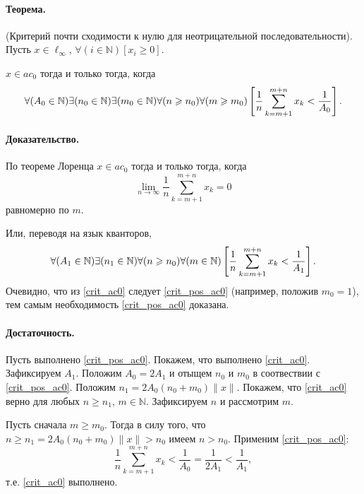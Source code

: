 \documentclass[a4paper,12pt,openbib]{report}
\begin{document}

\paragraph{Теорема.}
(Критерий почти сходимости к нулю для неотрицательной последовательности).
Пусть $x\in\ell_{\infty}$,
$\forall(i\in\mathbb{N})[x_i\geq 0]$.

$x\in ac_0$ тогда и только тогда, когда
\begin{equation}\label{crit_pos_ac0}
	\forall(A_0\in\mathbb{N})
	\exists(n_0\in\mathbb{N})
	\exists(m_0\in\mathbb{N})
	\forall(n\geq n_0)
	\forall(m\geq m_0)
	\\
	\left[
		\frac{1}{n}
		\sum_{k=m+1}^{m+n} x_k
		<
		\frac{1}{A_0}
	\right]
	.
\end{equation}

\paragraph{Доказательство.}
По теореме Лоренца $x\in ac_0$ тогда и только тогда, когда
\begin{equation}\label{Lorencz_ac0}
	\lim_{n\to\infty} \frac{1}{n} \sum_{k=m+1}^{m+n} x_k = 0
\end{equation}
равномерно по $m$.

Или, переводя на язык кванторов,
\begin{equation}\label{crit_ac0}
	\forall(A_1\in\mathbb{N})
	\exists(n_1\in\mathbb{N})
	\forall(n\geq n_0)
	\forall(m \in \mathbb{N})
	\\
	\left[
		\frac{1}{n}
		\sum_{k=m+1}^{m+n} x_k
		<
		\frac{1}{A_1}
	\right]
	.
\end{equation}
Очевидно, что из \eqref{crit_ac0} следует \eqref{crit_pos_ac0} (например, положив $m_0 = 1$),
тем самым необходимость \eqref{crit_pos_ac0} доказана.

\paragraph{Достаточность.}
Пусть выполнено \eqref{crit_pos_ac0}.
Покажем, что выполнено \eqref{crit_ac0}.
Зафиксируем $A_1$.
Положим $A_0 = 2A_1$ и отыщем $n_0$ и $m_0$ в соотвествии с \eqref{crit_pos_ac0}.
Положим $n_1 = 2A_0(n_0+m_0)\|x\|$.
Покажем, что \eqref{crit_ac0} верно для любых $n\geq n_1$, $m\in \mathbb{N}$.
Зафиксируем $n$ и рассмотрим $m$.

Пусть сначала $m\geq m_0$.
Тогда в силу того, что $n\geq n_1 = 2A_0(n_0+m_0)\|x\| > n_0$ имеем $n>n_0$.
Применим \eqref{crit_pos_ac0}:
\begin{equation}
	\frac{1}{n}
	\sum_{k=m+1}^{m+n} x_k
	<
	\frac{1}{A_0}
	=
	\frac{1}{2A_1}
	<
	\frac{1}{A_1}
	,
\end{equation}
т.е. \eqref{crit_ac0} выполнено.
\end{document}
